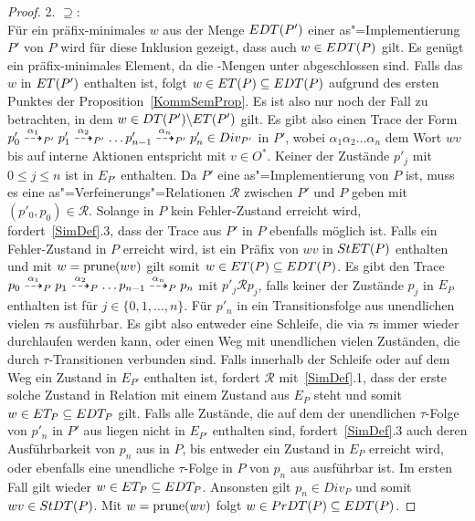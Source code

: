 \begin{proof}
  2. \glqq$\supseteq$\grqq{}:\\
  Für ein präfix-minimales $w$ aus der Menge $EDT (P')$ einer
  as"=Implementierung $P'$ von $P$ wird für diese Inklusion gezeigt, dass auch
  $w\in EDT (P)$ gilt. Es genügt ein präfix-minimales Element, da die
  \EDT{}-Mengen unter \cont{} abgeschlossen sind. Falls das $w$ in $ET (P')$
  enthalten ist, folgt $w\in ET (P) \subseteq EDT (P)$ aufgrund des ersten
  Punktes der Proposition~\ref{KommSemProp}. Es ist also nur noch der Fall zu
  betrachten, in dem $w\in DT (P') \backslash ET (P')$ gilt. Es gibt also
  einen Trace der Form $p'_0 \may[\alpha _1]_{P'} p'_1 \may[\alpha _2]_{P'}
  \dots p'_{n-1} \may[\alpha _n]_{P'} p'_n\in Div _{P'}$ in $P'$, wobei $\alpha
  _1\alpha _2\dots\alpha _n$ dem Wort $wv$ bis auf interne Aktionen entspricht
  mit $v\in O^*$. Keiner der Zustände $p'_j$ mit $0\leq j \leq n$ ist in
  $E_{P'}$ enthalten. Da $P'$ eine as"=Implementierung von $P$ ist, muss es
  eine as"=Verfeinerungs"=Relationen $\mathcal{R}$ zwischen $P'$ und $P$ geben
  mit $(p'_0,p_0) \in\mathcal{R}$. Solange in $P$ kein Fehler-Zustand erreicht
  wird, fordert~\ref{SimDef}.3, dass der Trace aus $P'$ in $P$ ebenfalls
  möglich ist. Falls ein Fehler-Zustand in $P$ erreicht wird, ist ein Präfix
  von $wv$ in $StET (P)$ enthalten und mit $w =\mathrm{prune} (wv)$ gilt somit $w\in
  ET (P) \subseteq EDT(P)$. Es gibt den Trace $p_0 \may[\alpha _1]_P p_1
  \may[\alpha _2]_P \dots p_{n-1} \may[\alpha _n]_P p_n$ mit $p'_j\mathcal{R}
  p_j$, falls keiner der Zustände $p_j$ in $E_P$ enthalten ist für $j\in\{0,1,
  \dots, n\}$. Für $p'_n$ in ein Transitionsfolge aus unendlichen vielen
  $\tau$s ausführbar. Es gibt also entweder eine Schleife, die via $\tau$s
  immer wieder durchlaufen werden kann, oder einen Weg mit unendlichen vielen
  Zuständen, die durch $\tau$-Transitionen verbunden sind. Falls innerhalb der
  Schleife oder auf dem Weg ein Zustand in $E_{P'}$ enthalten ist, fordert
  $\mathcal{R}$ mit~\ref{SimDef}.1, dass der erste solche Zustand in Relation
  mit einem Zustand aus $E_P$ steht und somit $w \in ET _P \subseteq EDT _P$
  gilt. Falls alle Zustände, die auf dem der unendlichen $\tau$-Folge von
  $p'_n$ in $P'$ aus liegen nicht in $E_{P'}$ enthalten sind,
  fordert~\ref{SimDef}.3 auch deren Ausführbarkeit von $p_n$ aus in $P$, bis
  entweder ein Zustand in $E_P$ erreicht wird, oder ebenfalls eine unendliche
  $\tau$-Folge in $P$ von $p_n$ aus ausführbar ist. Im ersten Fall gilt wieder
  $w \in ET _P \subseteq EDT _P$. Ansonsten gilt $p_n\in Div _P$ und somit
  $wv\in StDT (P)$. Mit $w=\mathrm{prune} (wv)$ folgt $w\in PrDT (P) \subseteq EDT
  (P)$.


\end{proof}
